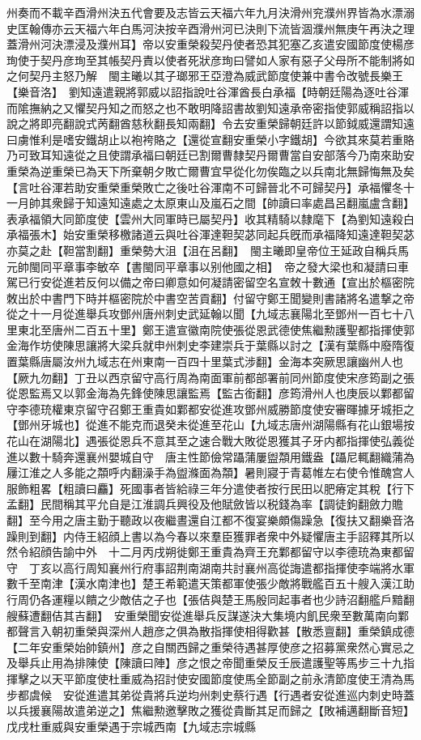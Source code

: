 州奏而不載辛酉滑州決五代會要及志皆云天福六年九月決滑州兖濮州界皆為水漂溺史匡翰傳亦云天福六年白馬河決按辛酉滑州河已決則下流皆涸濮州無庚午再決之理蓋滑州河決漂浸及濮州耳】帝以安重榮殺契丹使者恐其犯塞乙亥遣安國節度使楊彦珣使于契丹彦珣至其帳契丹責以使者死狀彦珣曰譬如人家有惡子父母所不能制將如之何契丹主怒乃解　閩主曦以其子瑯邪王亞澄為威武節度使兼中書令改號長樂王【樂音洛】　劉知遠遣親將郭威以詔指說吐谷渾酋長白承福【時朝廷陽為逐吐谷渾而隂撫納之又懼契丹知之而怒之也不敢明降詔書故劉知遠承帝密指使郭威稱詔指以說之將即亮翻說式苪翻酋慈秋翻長知兩翻】令去安重榮歸朝廷許以節鉞威還謂知遠曰虜惟利是嗜安鐵胡止以袍袴賂之【還從宣翻安重榮小字鐵胡】今欲其來莫若重賂乃可致耳知遠從之且使謂承福曰朝廷已割爾曹隸契丹爾曹當自安部落今乃南來助安重榮為逆重榮已為天下所棄朝夕敗亡爾曹宜早從化勿俟臨之以兵南北無歸悔無及矣【言吐谷渾若助安重榮重榮敗亡之後吐谷渾南不可歸晉北不可歸契丹】承福懼冬十一月帥其衆歸于知遠知遠處之太原東山及嵐石之間【帥讀曰率處昌呂翻嵐盧含翻】表承福領大同節度使【雲州大同軍時已屬契丹】收其精騎以隸麾下【為劉知遠殺白承福張木】始安重榮移檄諸道云與吐谷渾達靼契苾同起兵旣而承福降知遠達靼契苾亦莫之赴【靼當割翻】重榮勢大沮【沮在呂翻】　閩主曦即皇帝位王延政自稱兵馬元帥閩同平章事李敏卒【書閩同平章事以别他國之相】　帝之發大梁也和凝請曰車駕已行安從進若反何以備之帝曰卿意如何凝請密留空名宣敇十數通【宣出於樞密院敇出於中書門下時并樞密院於中書空苦貢翻】付留守鄭王聞變則書諸將名遣撃之帝從之十一月從進舉兵攻鄧州唐州刺史武延翰以聞【九域志襄陽北至鄧州一百七十八里東北至唐州二百五十里】鄭王遣宣徽南院使張從恩武德使焦繼勲護聖都指揮使郭金海作坊使陳思讓將大梁兵就申州刺史李建崇兵于葉縣以討之【漢有葉縣中廢隋復置葉縣唐屬汝州九域志在州東南一百四十里葉式涉翻】金海本突厥思讓幽州人也【厥九勿翻】丁丑以西京留守高行周為南面軍前都部署前同州節度使宋彦筠副之張從恩監焉又以郭金海為先鋒使陳思讓監焉【監古銜翻】彦筠滑州人也庚辰以鄴都留守李德珫權東京留守召鄭王重貴如鄴都安從進攻鄧州威勝節度使安審暉據牙城拒之【鄧州牙城也】從進不能克而退癸未從進至花山【九域志唐州湖陽縣有花山銀場按花山在湖陽北】遇張從恩兵不意其至之速合戰大敗從恩獲其子牙内都指揮使弘義從進以數十騎奔還襄州嬰城自守　唐主性節儉常躡蒲屢盥頮用鐵盎【躡尼輒翻織蒲為屨江淮之人多能之頮呼内翻澡手為盥滌面為頮】暑則寢于青葛帷左右使令惟醜宫人服飾粗畧【粗讀曰麤】死國事者皆給祿三年分遣使者按行民田以肥瘠定其稅【行下孟翻】民間稱其平允自是江淮調兵興役及他賦斂皆以税錢為率【調徒鉤翻斂力贍翻】至今用之唐主勤于聽政以夜繼晝還自江都不復宴樂頗傷躁急【復扶又翻樂音洛躁則到翻】内侍王紹顔上書以為今春以來羣臣獲罪者衆中外疑懼唐主手詔釋其所以然令紹顔告諭中外　十二月丙戌朔徙鄭王重貴為齊王充鄴都留守以李德珫為東都留守　丁亥以高行周知襄州行府事詔荆南湖南共討襄州高從誨遣都指揮使李端將水軍數千至南津【漢水南津也】楚王希範遣天策都軍使張少敵將戰艦百五十艘入漢江助行周仍各運糧以饋之少敵佶之子也【張佶與楚王馬殷同起事者也少詩沼翻艦戶黯翻艘蘇遭翻佶其吉翻】　安重榮聞安從進舉兵反謀遂決大集境内飢民衆至數萬南向鄴都聲言入朝初重榮與深州人趙彦之俱為散指揮使相得歡甚【散悉亶翻】重榮鎮成德【二年安重榮始帥鎮州】彦之自關西歸之重榮待遇甚厚使彦之招募黨衆然心實忌之及舉兵止用為排陳使【陳讀曰陣】彦之恨之帝聞重榮反壬辰遣護聖等馬步三十九指揮擊之以天平節度使杜重威為招討使安國節度使馬全節副之前永清節度使王清為馬步都虞候　安從進遣其弟從貴將兵逆均州刺史蔡行遇【行遇者安從進巡内刺史時蓋以兵援襄陽故遣弟逆之】焦繼勲邀擊敗之獲從貴斷其足而歸之【敗補邁翻斷音短】　戊戌杜重威與安重榮遇于宗城西南【九域志宗城縣